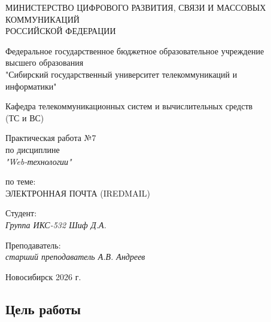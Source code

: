 \documentclass[a4paper,14pt,oneside,openany]{memoir}
\begin{document}
\thispagestyle{empty}

\begin{center}
    МИНИСТЕРСТВО ЦИФРОВОГО РАЗВИТИЯ, СВЯЗИ И МАССОВЫХ \\ КОММУНИКАЦИЙ \\ РОССИЙСКОЙ ФЕДЕРАЦИИ

    \vspace{20pt}

    Федеральное государственное бюджетное образовательное учреждение \\ высшего образования \\
    "Сибирский государственный университет телекоммуникаций и \\ информатики"

    \vspace{20pt}

    Кафедра телекоммуникационных систем и вычислительных средств \\ (ТС и ВС)
\end{center}

\vfill

\begin{center}
    Практическая работа №7 \\
    по дисциплине \\
    \textit{"Web-технологии"}

    \vspace{20pt}

    по теме: \\
    \uppercase{Электронная почта (iRedMail)}
\end{center}

\vfill

\noindent Студент: \\
\textit{Группа ИКС-532 \hfill Шиф Д.А.}

\vspace{20pt}

\noindent Преподаватель: \\
\textit{старший преподаватель \hfill А.В. Андреев}

\vfill

\begin{center}
    Новосибирск 2026 г.
\end{center}

\newpage
\setcounter{page}{2}
\OnehalfSpacing*

\subsection*{Цель работы}
\end{document}
